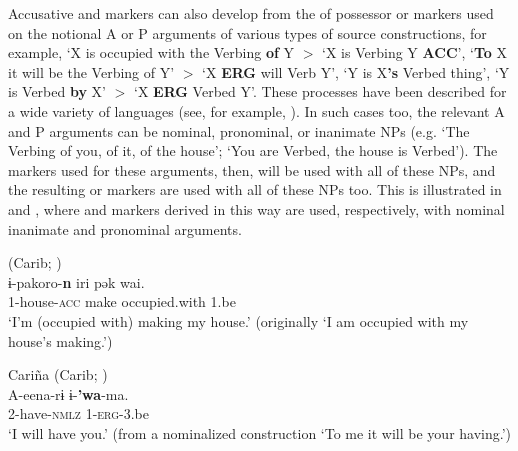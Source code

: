 \documentclass[output=paper]{langsci/langscibook}
\begin{document}
Accusative and  markers  can  also develop from the
   of possessor or  markers used on the notional A or
  P arguments of various types of source constructions, for example,
  `X is occupied with the Verbing  {\bf of} Y $>$ `X
        is Verbing Y {\bf ACC}', `{\bf To} X it will be the Verbing
        of Y' $>$ `X {\bf ERG} 
        will Verb Y',  `Y is X{\bf 's} Verbed thing', `Y is
        Verbed {\bf by} X'
        $>$ `X {\bf ERG} Verbed Y'. These processes have been described for
        a wide variety of languages (see, for example,
     \citealt{HarrisCampbell1995,Bubenik1998,Gildea1998,Creissels2008}). In such cases
        too,  the relevant A and P arguments can be nominal,
        pronominal,  or inanimate NPs (e.g. `The Verbing of
        you, of it, of the house'; `You are Verbed, the house is
        Verbed'). The  markers used for these arguments, then,  will
        be used with all of these NPs, and the resulting  or
         markers are used with all of these NPs too. This is
        illustrated in  and , where  and
         markers derived in this way are used, respectively,
        with nominal inanimate and pronominal  arguments.

\newpage

\ea\label{wayana}
 (Carib;  )\\
\gll ​ɨ-pakoro-\textbf{{n}} iri pək wai.\\
1-house-\textsc{acc} make occupied.with 1.be\\
\glt `I'm (occupied with) making my house.' (originally `I am occupied with my house's making.')

\z

\ea\label{carina}
Cari\~na (Carib;  )\\
\gll A-eena-r​ɨ ​ɨ-\textbf{{'wa}}-ma.\\
2-have-\textsc{nmlz} 1-\textsc{erg}-3.be\\
\glt `I will have you.' (from a nominalized construction `To me it will be your having.')

\z
\end{document}
